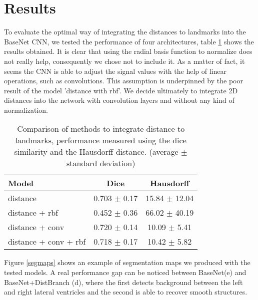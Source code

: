 \documentclass{article}
\begin{document}
\newpage
\section{Results}
To evaluate the optimal way of integrating the distances to landmarks into the BaseNet CNN, we tested the performance of four architectures, table \ref{tab:distance} shows the results obtained. It is clear that using the radial basis function to normalize does not really help, consequently we chose not to include it. As a matter of fact, it seems the CNN is able to adjust the signal values with the help of linear operations, such as convolutions. This assumption is underpinned by the poor result of the model 'distance with rbf'. We decide ultimately to integrate 2D distances into the network with convolution layers and without any kind of normalization.

\begin{table}
  \centering
  \begin{tabular}{l|c|c}
    Model & Dice & Hausdorff \\
    \hline
    distance & 0.703 $\pm$ 0.17 & 15.84 $\pm$ 12.04\\
    distance + rbf & 0.452 $\pm$ 0.36 & 66.02 $\pm$ 40.19\\
    distance + conv & 0.720 $\pm$ 0.14 & 10.09 $\pm$ 5.41\\
    distance + conv + rbf & 0.718 $\pm$ 0.17 & 10.42 $\pm$ 5.82\\
  \end{tabular}
  \caption{Comparison of methods to integrate distance to landmarks, performance measured using the dice similarity and the Hausdorff distance. (average $\pm$ standard deviation)}
  \label{tab:distance}
\end{table}
Figure \ref{segmaps} shows an example of segmentation maps we produced with the tested models. A real performance gap can be noticed between BaseNet(e) and BaseNet+DistBranch (d), where the first detects background between the left and right lateral ventricles and the second is able to recover smooth structures.
\end{document}

